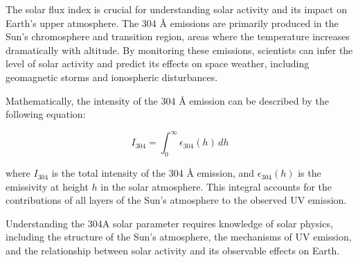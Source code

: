 The solar flux index is crucial for understanding solar activity and its impact on Earth's upper atmosphere. The 304 Å emissions are primarily produced in the Sun's chromosphere and transition region, areas where the temperature increases dramatically with altitude. By monitoring these emissions, scientists can infer the level of solar activity and predict its effects on space weather, including geomagnetic storms and ionospheric disturbances.

Mathematically, the intensity of the 304 Å emission can be described by the following equation:

\[
I_{304} = \int_{0}^{\infty} \epsilon_{304}(h) \, dh
\]

where \( I_{304} \) is the total intensity of the 304 Å emission, and \( \epsilon_{304}(h) \) is the emissivity at height \( h \) in the solar atmosphere. This integral accounts for the contributions of all layers of the Sun's atmosphere to the observed UV emission.

Understanding the 304A solar parameter requires knowledge of solar physics, including the structure of the Sun's atmosphere, the mechanisms of UV emission, and the relationship between solar activity and its observable effects on Earth.

